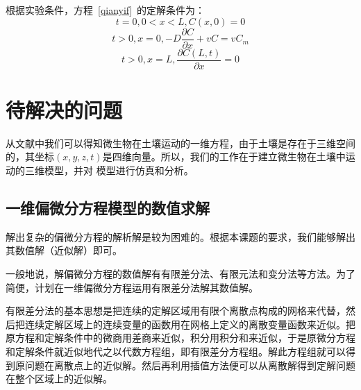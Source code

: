 \documentclass[a4paper,cs4size,adobefonts,fancyhdr]{ctexart}[2005/11/25]
\newcommand{\upcite}[1]{\textsuperscript{\textsuperscript{\cite{#1}}}}
\numberwithin{equation}{section} %
\begin{document}
根据实验条件，方程~\ref{qianyif}~的定解条件为：
\begin{equation}
	t=0,0<x<L,C(x,0)=0
\end{equation}
\begin{equation}
	t>0,x=0,-D\dfrac{\partial C}{\partial x}+vC=vC_m
\end{equation}
\begin{equation}
	t>0,x=L,\dfrac{\partial C(L,t)}{\partial x}=0
\end{equation}
\section{待解决的问题}
从文献中我们可以得知微生物在土壤运动的一维方程，由于土壤是存在于三维空间的，其坐标$(x,y,z,t)$是四维向量。所以，我们的工作在于建立微生物在土壤中运动的三维模型，并对 模型进行仿真和分析。
\subsection{一维偏微分方程模型的数值求解}
解出复杂的偏微分方程的解析解是较为困难的。根据本课题的要求，我们能够解出其数值解（近似解）即可。\par
一般地说，解偏微分方程的数值解有有限差分法、有限元法和变分法等方法。为了简便，计划在一维偏微分方程运用有限差分法解其数值解。\par
有限差分法的基本思想是把连续的定解区域用有限个离散点构成的网格来代替，然后把连续定解区域上的连续变量的函数用在网格上定义的离散变量函数来近似。把原方程和定解条件中的微商用差商来近似，积分用积分和来近似，于是原微分方程和定解条件就近似地代之以代数方程组，即有限差分方程组。解此方程组就可以得到原问题在离散点上的近似解。然后再利用插值方法便可以从离散解得到定解问题在整个区域上的近似解\upcite{ZHANGWENSHENG_KEXUE}。
\end{document}
